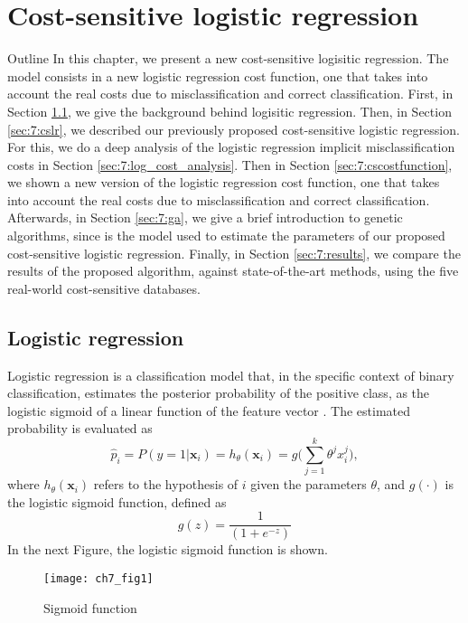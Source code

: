 \chapter{Cost-sensitive logistic regression}\label{ch:7}

\begin{remark}{Outline}
In this chapter, we present a new cost-sensitive logisitic regression. The model consists in a new
logistic regression cost function, one that takes into account the real costs due to 
misclassification and correct classification. First, in Section \ref{sec:7:logistic}, we give the 
background behind logisitic regression. Then, in Section \ref{sec:7:cslr}, we described our 
previously proposed cost-sensitive logistic regression. For this, we do a deep analysis of the 
logistic regression implicit misclassification costs in Section \ref{sec:7:log_cost_analysis}. Then 
in Section \ref{sec:7:cscostfunction}, we shown a new version of the logistic regression cost 
function, one that takes into account the real costs due to misclassification and correct 
classification. Afterwards, in Section \ref{sec:7:ga}, we give a brief introduction to genetic 
algorithms, since is the model used to estimate the parameters of our proposed cost-sensitive 
logistic regression. Finally, in Section \ref{sec:7:results}, we compare the results of the proposed 
algorithm, against state-of-the-art methods, using the five real-world cost-sensitive databases.
\end{remark}


\section{Logistic regression}
\label{sec:7:logistic}

Logistic regression is a classification model that, in the specific context of binary 
classification, estimates the posterior probability of the positive class, as the logistic sigmoid 
of a linear function of the feature vector \citep{Bishop2006}. The estimated probability  is 
evaluated as 
\begin{equation}
  \hat p_i = P(y=1 \vert \mathbf{x}_i) = h_{\theta}(\mathbf{x}_i) = 
  g\bigg(\sum_{j=1}^{k}{\theta^jx_i^j}\bigg),
\end{equation}
where $h_\theta(\mathbf{x}_i)$ refers to the hypothesis of $i$ given the parameters $\theta$,  
and  $g(\cdot)$ is the logistic sigmoid function, defined as
\begin{equation}
  g(z)=\frac{1}{(1+e^{-z})} 
\end{equation}
In the next Figure, the logistic sigmoid function is shown.
\begin{figure}[htbp]
  \centering
  \texttt{[image: ch7\_fig1]}
  \caption{Sigmoid function}
  \label{fig:ch7:1}
\end{figure}

